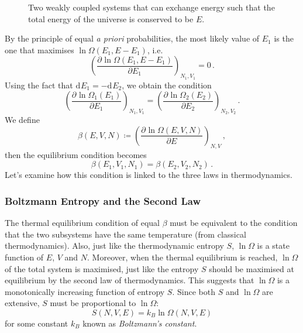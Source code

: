 \documentclass{article}
\theoremstyle{plain}\theoremheaderfont{\normalfont\bfseries}\theorembodyfont{\rmfamily}\theoremseparator{.}\newtheorem*{thm}{Theorem}\newtheorem*{law}{Law}\newtheorem*{pos}{Postulate}
\numberwithin{equation}{section}
\renewcommand{\d}[2][]{\mathrm{d}^{#1} #2}
\newcommand{\pdv}[3][]{\frac{\partial^{#1} #2}{{\partial #3}^{#1}}}
\begin{document}
    \begin{figure}[ht!]
        \centering
        \caption{Two weakly coupled systems that can exchange energy such that the total energy of the universe is conserved to be \(E\).}
        \label{Fig:WeaklyCoupledSystems}
    \end{figure}

    By the principle of equal \textit{a priori} probabilities, the most likely value of \(E_1\) is the one that maximises \(\ln\Omega(E_1,E-E_1)\), i.e.
    \begin{equation}
        \left(\pdv{\ln\Omega(E_1,E-E_1)}{E_1}\right)_{N_1,V_1}=0\,.
    \end{equation}
    Using the fact that \(\d{E}_1=-\d{E}_2\), we obtain the condition
    \begin{equation}
        \left(\pdv{\ln\Omega_1(E_1)}{E_1}\right)_{N_1,V_1}=\left(\pdv{\ln\Omega_2(E_2)}{E_2}\right)_{N_2,V_2}\,.
    \end{equation}
    We define
    \begin{equation}
        \beta(E,V,N)\coloneqq\left(\pdv{\ln\Omega(E,V,N)}{E}\right)_{N,V}\,,
    \end{equation}
    then the equilibrium condition becomes
    \begin{equation}
        \beta(E_1,V_1,N_1)=\beta(E_2,V_2,N_2)\,.
    \end{equation}
    Let's examine how this condition is linked to the three laws in thermodynamics.

    \subsubsection{Boltzmann Entropy and the Second Law}
    The thermal equilibrium condition of equal \(\beta\) must be equivalent to the condition that the two subsystems have the same temperature (from classical thermodynamics). Also, just like the thermodynamic entropy \(S\), \(\ln\Omega\) is a state function of \(E\), \(V\) and \(N\). Moreover, when the thermal equilibrium is reached, \(\ln\Omega\) of the total system is maximised, just like the entropy \(S\) should be maximised at equilibrium by the second law of thermodynamics. This suggests that \(\ln\Omega\) is a monotonically increasing function of entropy \(S\). Since both \(S\) and \(\ln\Omega\) are extensive, \(S\) must be proportional to \(\ln\Omega\):
    \begin{equation}
        S(N,V,E)=k_B\ln\Omega(N,V,E)
    \end{equation}
    for some constant \(k_B\) known as \textit{Boltzmann's constant}.
\end{document}
